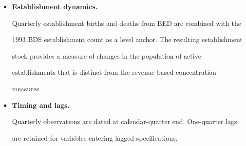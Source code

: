 \documentclass[11pt]{article}
\begin{document}
\begin{itemize}
    The Capital IQ measure is constructed directly at quarterly frequency from

    revenues of U.S. public firms listed on major exchanges. Firm-level revenue

    shares are aggregated into market-level HHIs, which are seasonally adjusted

    before aggregation. Economy-wide effective-firm measures are then constructed

    using both firm-count and revenue weights.

    \item \textbf{Establishment dynamics.}

    Quarterly establishment births and deaths from BED are combined with the

    1993 BDS establishment count as a level anchor. The resulting establishment

    stock provides a measure of changes in the population of active

    establishments that is distinct from the revenue-based concentration

    measures.

    \item \textbf{Timing and lags.}

    Quarterly observations are dated at calendar-quarter end. One-quarter lags

    are retained for variables entering lagged specifications.

\end{itemize}
\end{document}
